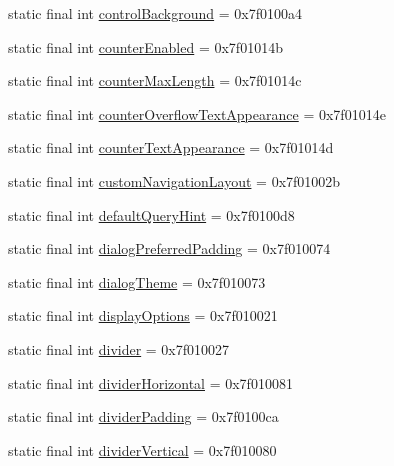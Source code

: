 \begin{CompactItemize}
\item 
static final int \hyperlink{classandroid_1_1support_1_1transition_1_1_r_1_1attr_50516898b1f98f0a6866f710a2a96a73}{controlBackground} = 0x7f0100a4
\item 
static final int \hyperlink{classandroid_1_1support_1_1transition_1_1_r_1_1attr_df88e8d3cfe96cb599fc00e43d1e89b2}{counterEnabled} = 0x7f01014b
\item 
static final int \hyperlink{classandroid_1_1support_1_1transition_1_1_r_1_1attr_c0ed172306482f8f040cd06327c06435}{counterMaxLength} = 0x7f01014c
\item 
static final int \hyperlink{classandroid_1_1support_1_1transition_1_1_r_1_1attr_ad9a33df56ce0d0b672435ab041713eb}{counterOverflowTextAppearance} = 0x7f01014e
\item 
static final int \hyperlink{classandroid_1_1support_1_1transition_1_1_r_1_1attr_57a10b30704f0a56b6efdd6f855cbbe4}{counterTextAppearance} = 0x7f01014d
\item 
static final int \hyperlink{classandroid_1_1support_1_1transition_1_1_r_1_1attr_061df5a544da4f07cf140d1818fdc52e}{customNavigationLayout} = 0x7f01002b
\item 
static final int \hyperlink{classandroid_1_1support_1_1transition_1_1_r_1_1attr_baf1c78bfbcfe1a873b226692eaa3b57}{defaultQueryHint} = 0x7f0100d8
\item 
static final int \hyperlink{classandroid_1_1support_1_1transition_1_1_r_1_1attr_018cd272e6206dfcb93435fdb813ac62}{dialogPreferredPadding} = 0x7f010074
\item 
static final int \hyperlink{classandroid_1_1support_1_1transition_1_1_r_1_1attr_bad9d7c728ee486a5695a93fdaeb99c2}{dialogTheme} = 0x7f010073
\item 
static final int \hyperlink{classandroid_1_1support_1_1transition_1_1_r_1_1attr_1df16a748f594018899fd49eb6ff9730}{displayOptions} = 0x7f010021
\item 
static final int \hyperlink{classandroid_1_1support_1_1transition_1_1_r_1_1attr_40d7bd25418d26b494822c3d7a48aea0}{divider} = 0x7f010027
\item 
static final int \hyperlink{classandroid_1_1support_1_1transition_1_1_r_1_1attr_1d03fb27a4a3f25461c7c3cf8a4ad1fb}{dividerHorizontal} = 0x7f010081
\item 
static final int \hyperlink{classandroid_1_1support_1_1transition_1_1_r_1_1attr_390f95a7874f4d36692fd2ea9dc621b1}{dividerPadding} = 0x7f0100ca
\item 
static final int \hyperlink{classandroid_1_1support_1_1transition_1_1_r_1_1attr_f90a337dd24e416f7d534e828e824ca6}{dividerVertical} = 0x7f010080

\end{CompactItemize}
